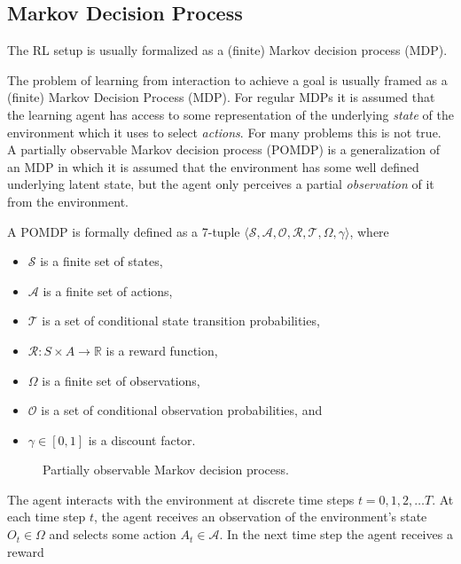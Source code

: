 \subsection{Markov Decision Process}

The RL setup is usually formalized as a (finite) Markov decision process (MDP).

The problem of learning from interaction to achieve a goal is usually framed as a (finite) Markov Decision Process (MDP). For regular MDPs it is assumed that the learning agent has access to some representation of the underlying \textit{state} of the environment which it uses to select \textit{actions}. For many problems this is not true. A partially observable Markov decision process (POMDP) is a generalization of an MDP in which it is assumed that the environment has some well defined underlying latent state, but the agent only perceives a partial \textit{observation} of it from the environment. 

A POMDP is formally defined as a 7-tuple \(\langle \mathcal{S}, \mathcal{A}, \mathcal{O}, \mathcal{R}, \mathcal{T}, \Omega, \gamma \rangle\), where

\begin{itemize}
    \item \(\mathcal{S}\) is a finite set of states,
    \item \(\mathcal{A}\) is a finite set of actions,
    \item \(\mathcal{T}\) is a set of conditional state transition probabilities,
    \item \(\mathcal{R} : S \times A \rightarrow \mathbb{R}\) is a reward function,
    \item \(\Omega\) is a finite set of observations,
    \item \(\mathcal{O}\) is a set of conditional observation probabilities, and
    \item \(\gamma \in [0, 1]\) is a discount factor.
\end{itemize}

\begin{figure}
    \centering
    
    \label{fig:pomdp}
    \caption{Partially observable Markov decision process.}
\end{figure}

The agent interacts with the environment at discrete time steps \(t = 0, 1, 2, \dots T\). At each time step \(t\), the agent receives an observation of the environment's state \(O_t \in \Omega\) and selects some action \(A_t \in \mathcal{A}\). In the next time step the agent receives a reward



